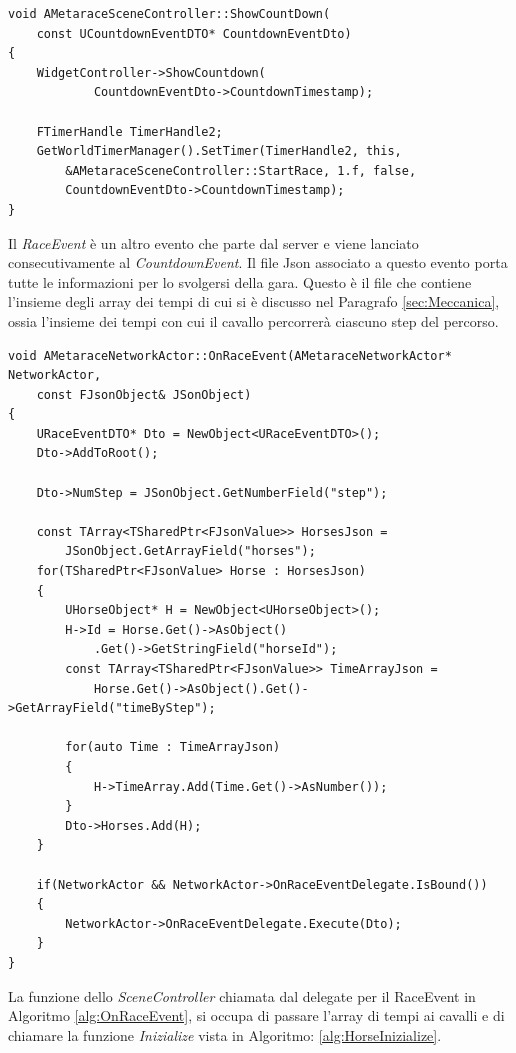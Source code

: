         \begin{lstlisting}[caption = Funzione nello SceneController che inizializza un \textit{FTimerHandle}]
void AMetaraceSceneController::ShowCountDown(
    const UCountdownEventDTO* CountdownEventDto)
{	
	WidgetController->ShowCountdown(
            CountdownEventDto->CountdownTimestamp);
	
	FTimerHandle TimerHandle2;
	GetWorldTimerManager().SetTimer(TimerHandle2, this, 
        &AMetaraceSceneController::StartRace, 1.f, false,
        CountdownEventDto->CountdownTimestamp);
}
        \end{lstlisting}

        Il \textit{RaceEvent} è un altro evento che parte dal server e viene lanciato consecutivamente al \textit{CountdownEvent}.
        Il file Json associato a questo evento porta tutte le informazioni per lo svolgersi della gara.
        Questo è il file che contiene l'insieme degli array dei tempi di cui si è discusso nel Paragrafo \ref{sec:Meccanica}, ossia l'insieme dei tempi con cui il cavallo percorrerà ciascuno step del percorso.

        \begin{lstlisting}[caption = Funzione che spacchetta il file Json relativo ai dati di gara, label = {alg:OnRaceEvent}]
void AMetaraceNetworkActor::OnRaceEvent(AMetaraceNetworkActor* NetworkActor, 
    const FJsonObject& JSonObject)
{
    URaceEventDTO* Dto = NewObject<URaceEventDTO>();
    Dto->AddToRoot();

    Dto->NumStep = JSonObject.GetNumberField("step");

    const TArray<TSharedPtr<FJsonValue>> HorsesJson = 
        JSonObject.GetArrayField("horses");
    for(TSharedPtr<FJsonValue> Horse : HorsesJson)
    {
        UHorseObject* H = NewObject<UHorseObject>();
        H->Id = Horse.Get()->AsObject()
            .Get()->GetStringField("horseId");
        const TArray<TSharedPtr<FJsonValue>> TimeArrayJson = 
            Horse.Get()->AsObject().Get()->GetArrayField("timeByStep");

        for(auto Time : TimeArrayJson)
        {
            H->TimeArray.Add(Time.Get()->AsNumber());
        }
        Dto->Horses.Add(H);
    }
    
    if(NetworkActor && NetworkActor->OnRaceEventDelegate.IsBound())
    {
        NetworkActor->OnRaceEventDelegate.Execute(Dto);
    }
}
        \end{lstlisting}

        La funzione dello \textit{SceneController} chiamata dal delegate per il RaceEvent in Algoritmo \ref{alg:OnRaceEvent}, si occupa di passare l'array di tempi ai cavalli e di chiamare la funzione \textit{Inizialize} vista in Algoritmo: \ref{alg:HorseInizialize}.

